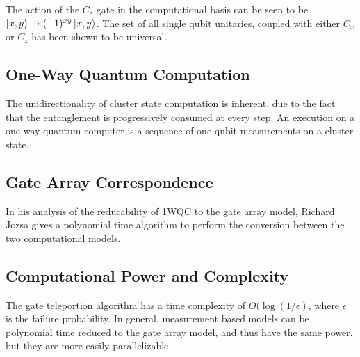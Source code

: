\documentclass[twocolumn]{IEEEtran11}
\begin{document}
The action of the $C_z$ gate in the computational basis can be seen to be $\left|\mspace{0.5mu} x,y \mspace{0.5mu}\right\rangle \to (-1)^{xy}\left|\mspace{0.5mu} x,y \mspace{0.5mu}\right\rangle$. The set of all single qubit unitaries, coupled with either $C_x$ or $C_z$ has been shown to be universal\cite{brylinski2002universal}.

\subsection{One-Way Quantum Computation}
The unidirectionality of cluster state computation is inherent, due to the fact that the entanglement is progressively consumed at every step. An execution on a one-way quantum computer is a sequence of one-qubit measurements on a cluster state\cite{jorrand2005unifying}.


\subsection{Gate Array Correspondence}
In his analysis of the reducability of 1WQC to the gate array model, Richard Jozsa gives a polynomial time algorithm to perform the conversion between the two computational models\cite{jozsa2006introduction}. 

\subsection{Computational Power and Complexity}
The gate teleportion algorithm\cite{nielsen108020universal} has a time complexity of $O(\log (1/\epsilon)$, where $\epsilon$ is the failure probability. In general, measurement based models can be polynomial time reduced to the gate array model, and thus have the same power, but they are more easily parallelizable\cite{jozsa2006introduction}.



\end{document}
